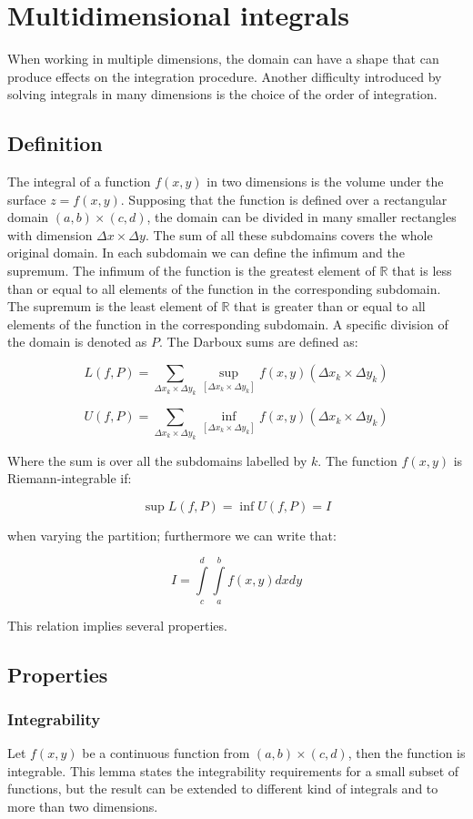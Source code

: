 \chapter{Multidimensional integrals}
When working in multiple dimensions, the domain can have a shape that can produce effects on the integration procedure.
Another difficulty introduced by solving integrals in many dimensions is the choice of the order of integration.

\section{Definition}
The integral of a function $f(x,y)$ in two dimensions is the volume under the surface $z = f(x,y)$.
Supposing that the function is defined over a rectangular domain $(a,b)\times (c,d)$, the domain can be divided in many smaller rectangles with dimension $\Delta x\times \Delta y$.
The sum of all these subdomains covers the whole original domain.
In each subdomain we can define the infimum and the supremum.
The infimum of the function is the greatest element of $\mathbb{R}$ that is less than or equal to all elements of the function in the corresponding subdomain.
The supremum is the least element of $\mathbb{R}$ that is greater than or equal to all elements of the function in the corresponding subdomain.
A specific division of the domain is denoted as $P$.
The Darboux sums are defined as:

$$L(f,P)= \sum\limits_{\Delta x_k\times \Delta y_k}\sup\limits_{[\Delta x_k\times \Delta y_k]} f(x,y)(\Delta x_k\times \Delta y_k)$$

$$U(f,P)= \sum\limits_{\Delta x_k\times \Delta y_k}\inf\limits_{[\Delta x_k\times \Delta y_k]} f(x,y)(\Delta x_k\times \Delta y_k)$$

Where the sum is over all the subdomains labelled by $k$.
The function $f(x,y)$ is Riemann-integrable if:

$$\sup L(f,P) = \inf U(f,P) = I$$

when varying the partition; furthermore we can write that:

$$I = \int\limits_c^d\int\limits_a^bf(x,y)dxdy$$

This relation implies several properties.

\section{Properties}

	\subsection{Integrability}
	Let $f(x,y)$ be a continuous function from $(a,b)\times (c,d)$, then the function is integrable.
	This lemma states the integrability requirements for a small subset of functions, but the result can be extended to different kind of integrals and to more than two dimensions.

